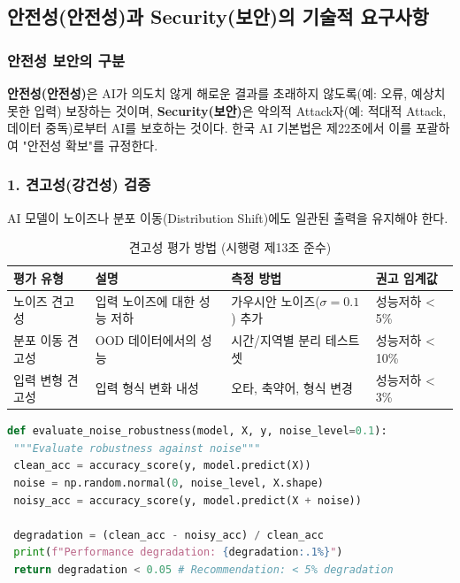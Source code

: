 \subsection{안전성(안전성)과 Security(보안)의 기술적 요구사항}

\subsubsection*{안전성 보안의 구분}
\textbf{안전성(안전성)}은 AI가 의도치 않게 해로운 결과를 초래하지 않도록(예: 오류, 예상치 못한 입력) 보장하는 것이며\cite{amodei2016concrete}, \textbf{Security(보안)}은 악의적 Attack자(예: 적대적 Attack\cite{goodfellow2014explaining}, 데이터 중독)로부터 AI를 보호하는 것이다\cite{papernot2016towards}. 한국 AI 기본법은 제22조에서 이를 포괄하여 "안전성 확보"를 규정한다.

\subsubsection*{1. 견고성(강건성) 검증}
AI 모델이 노이즈나 분포 이동(Distribution Shift)에도 일관된 출력을 유지해야 한다.

\begin{table}[h]
\centering
\caption{견고성 평가 방법 (시행령 제13조 준수)}
\begin{tabular}{|l|p{3.5cm}|p{3.5cm}|p{2cm}|}
\hline
\textbf{평가 유형} & \textbf{설명} & \textbf{측정 방법} & \textbf{권고 임계값} \\ \hline
노이즈 견고성 & 입력 노이즈에 대한 성능 저하 & 가우시안 노이즈($\sigma=0.1$) 추가 & 성능저하 < 5\% \\ \hline
분포 이동 견고성 & OOD 데이터에서의 성능 & 시간/지역별 분리 테스트셋 & 성능저하 < 10\% \\ \hline
입력 변형 견고성 & 입력 형식 변화 내성 & 오타, 축약어, 형식 변경 & 성능저하 < 3\% \\ \hline
\end{tabular}
\end{table}

\begin{lstlisting}[language=Python, caption={Safety Evaluator}, label={code:safety-eval}]
def evaluate_noise_robustness(model, X, y, noise_level=0.1):
 """Evaluate robustness against noise"""
 clean_acc = accuracy_score(y, model.predict(X))
 noise = np.random.normal(0, noise_level, X.shape)
 noisy_acc = accuracy_score(y, model.predict(X + noise))
 
 degradation = (clean_acc - noisy_acc) / clean_acc
 print(f"Performance degradation: {degradation:.1%}")
 return degradation < 0.05 # Recommendation: < 5% degradation
\end{lstlisting}

